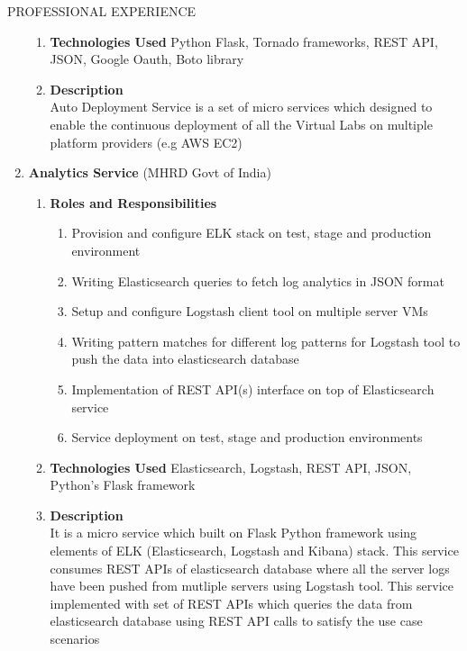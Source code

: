 \documentclass{resume} %
\newcommand{\blank}[1]{\hspace*{#1}}
\begin{document}
\begin{rSection}{PROFESSIONAL EXPERIENCE}
\begin{rSubsection}
\begin{enumerate}[label=\bfseries\arabic*]
\begin{enumerate}
  \item \textbf{Technologies Used } Python Flask, Tornado frameworks, REST
    API, JSON, Google Oauth, Boto library
  \item \textbf{Description } \\
    \blank{2 cm}Auto Deployment Service is a set of micro services which designed to enable
    the continuous deployment of all the Virtual Labs on multiple platform
    providers (e.g AWS EC2)
  \end{enumerate}

\item \textbf{Analytics Service} (MHRD Govt of India)
  \begin{enumerate}
  \item \textbf{Roles and Responsibilities }
    \begin{enumerate}
    \item Provision and configure ELK stack on test, stage and
      production environment
    \item Writing Elasticsearch queries to fetch log analytics in JSON
      format
    \item Setup and configure Logstash client tool on multiple server
      VMs
    \item Writing pattern matches for different log patterns for
      Logstash tool to push the data into elasticsearch database
    \item Implementation of REST API(s) interface on top of
      Elasticsearch service
    \item Service deployment on test, stage and production environments
    \end{enumerate}
  \item \textbf{Technologies Used } Elasticsearch, Logstash, REST API,
    JSON, Python's Flask framework
  \item \textbf{Description } \\
    \blank{2 cm} It is a micro service which built on Flask Python framework using elements of ELK
    (Elasticsearch, Logstash and Kibana) stack. This service consumes REST
    APIs of elasticsearch database where all the server logs have been
    pushed from mutliple servers using Logstash tool. This service
    implemented with set of REST APIs which queries the data from
    elasticsearch database using REST API calls to satisfy the use case
    scenarios
  \end{enumerate}


\end{enumerate}
\end{rSubsection}
\end{rSection}
\end{document}
